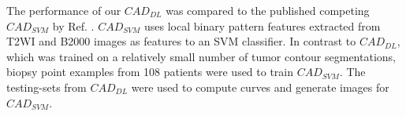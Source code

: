 The performance of our $CAD_{DL}$ was compared to the published competing $CAD_{SVM}$ by Ref. . $CAD_{SVM}$ uses local binary pattern features extracted from T2WI and B2000 images as features to an SVM classifier. In contrast to $CAD_{DL}$, which was trained on a relatively small number of tumor contour segmentations, biopsy point examples from 108 patients were used to train $CAD_{SVM}$. The testing-sets from $CAD_{DL}$ were used to compute curves and generate images for $CAD_{SVM}$. 
